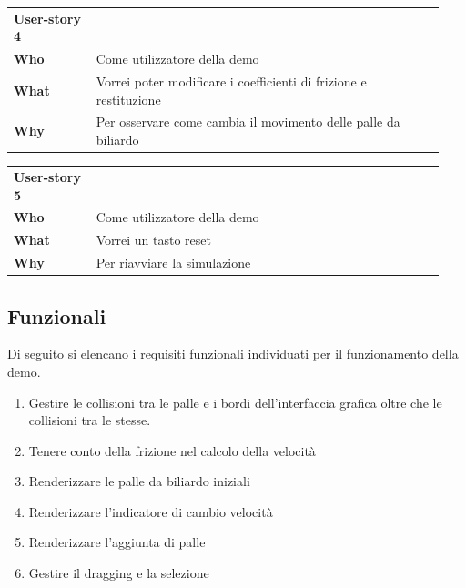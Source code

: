 \begin{table}[H]
    \begin{tabular}{p{0.18\linewidth}p{0.76\linewidth}}
        \toprule
        \textbf{User-story 4} &                                                                   \\
        \textbf{Who}          & Come utilizzatore della demo                                      \\
        \textbf{What}         & Vorrei poter modificare i coefficienti di frizione e restituzione \\
        \textbf{Why}          & Per osservare come cambia il movimento delle palle da biliardo    \\
        \bottomrule
    \end{tabular}\label{tab:user-story-4}
\end{table}
\begin{table}[H]
    \begin{tabular}{p{0.18\linewidth}p{0.76\linewidth}}
        \toprule
        \textbf{User-story 5} &                              \\
        \textbf{Who}          & Come utilizzatore della demo \\
        \textbf{What}         & Vorrei un tasto reset        \\
        \textbf{Why}          & Per riavviare la simulazione \\
        \bottomrule
    \end{tabular}\label{tab:user-story-5}
\end{table}

\subsection{Funzionali}\label{subsec:demo-funzionali}
Di seguito si elencano i requisiti funzionali individuati per il funzionamento della demo.
\begin{enumerate}[label=\textbf{\ref{subsec:demo-funzionali}.\arabic*}]
    \item \label{itm:df1} Gestire le collisioni tra le palle e i bordi dell'interfaccia grafica oltre che le collisioni tra le stesse.
    \item \label{itm:df2} Tenere conto della frizione nel calcolo della velocità
    \item \label{itm:df3} Renderizzare le palle da biliardo iniziali
    \item \label{itm:df4} Renderizzare l'indicatore di cambio velocità
    \item \label{itm:df5} Renderizzare l'aggiunta di palle
    \item \label{itm:df6} Gestire il dragging e la selezione
\end{enumerate}


